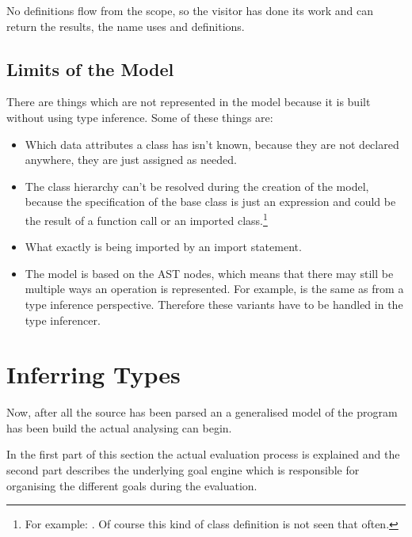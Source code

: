 \documentclass[12pt,halfparskip,DIV11,BCOR10mm]{scrreprt}
\begin{document}
No definitions flow from the scope, so the visitor has done its work and can return the results, the name uses and definitions.



\subsection{Limits of the Model}

There are things which are not represented in the model because it is built without using type inference. Some of these things are:

\begin{itemize}
	\item Which data attributes a class has isn't known, because they are not declared anywhere, they are just assigned as needed.
	\item The class hierarchy can't be resolved during the creation of the model, because the specification of the base class is just an expression and could be the result of a function call or an imported class.\footnote{
	For example: . Of course this kind of class definition is not seen that often.}
	\item What exactly is being imported by an import statement.
	\item The model is based on the AST nodes, which means that there may still be multiple ways an operation is represented. For example,  is the same as  from a type inference perspective. Therefore these variants have to be handled in the type inferencer.
\end{itemize}


\section{Inferring Types}

Now, after all the source has been parsed an a generalised model of the program has been build the actual analysing can begin. 

In the first part of this section the actual evaluation process is explained and the second part describes the underlying goal engine which is responsible for organising the different goals during the evaluation.
\end{document}

